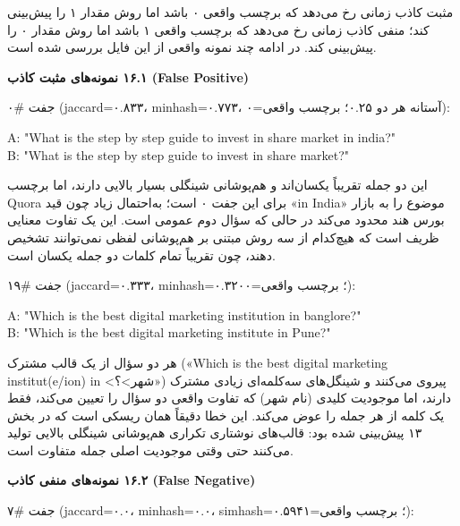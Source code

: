 \documentclass[11pt]{article}
\begin{document}
\noindent ‏مثبت کاذب زمانی رخ می‌دهد که برچسب واقعی ۰ باشد اما روش مقدار ۱ را پیش‌بینی کند؛ منفی کاذب زمانی رخ می‌دهد که برچسب واقعی ۱ باشد اما روش مقدار ۰ را پیش‌بینی کند. در ادامه چند نمونه واقعی از این فایل بررسی شده است.\par

\smallskip
{\bfseries ‏۱۶.۱ نمونه‌های مثبت کاذب (False Positive)}\smallskip


\noindent ‏جفت \#۰ (jaccard=۰.۸۳۳، minhash=۰.۷۷۳، آستانه هر دو ۰.۲۵؛ برچسب واقعی=۰):\par

{\mycode
\begin{flushleft}
A: "What is the step by step guide to invest in share market in india?" \\
B: "What is the step by step guide to invest in share market?"
\end{flushleft}}

\noindent ‏این دو جمله تقریباً یکسان‌اند و هم‌پوشانی شینگلی بسیار بالایی دارند، اما برچسب Quora برای این جفت ۰ است؛ به‌احتمال زیاد چون قید «in India» موضوع را به بازار بورس هند محدود می‌کند در حالی که سؤال دوم عمومی است. این یک تفاوت معنایی ظریف است که هیچ‌کدام از سه روش مبتنی بر هم‌پوشانی لفظی نمی‌توانند تشخیص دهند، چون تقریباً تمام کلمات دو جمله یکسان است.\par

\noindent ‏جفت \#۱۹ (jaccard=۰.۳۳۳، minhash=۰.۳۲۰؛ برچسب واقعی=۰):\par

{\mycode
\begin{flushleft}
A: "Which is the best digital marketing institution in banglore?" \\
B: "Which is the best digital marketing institute in Pune?"
\end{flushleft}}

\noindent ‏هر دو سؤال از یک قالب مشترک («Which is the best digital marketing institut(e/ion) in <شهر>؟») پیروی می‌کنند و شینگل‌های سه‌کلمه‌ای زیادی مشترک دارند، اما موجودیت کلیدی (نام شهر) که تفاوت واقعی دو سؤال را تعیین می‌کند، فقط یک کلمه از هر جمله را عوض می‌کند. این خطا دقیقاً همان ریسکی است که در بخش ۱۳ پیش‌بینی شده بود: قالب‌های نوشتاری تکراری هم‌پوشانی شینگلی بالایی تولید می‌کنند حتی وقتی موجودیت اصلی جمله متفاوت است.\par

\smallskip
{\bfseries ‏۱۶.۲ نمونه‌های منفی کاذب (False Negative)}\smallskip


\noindent ‏جفت \#۷ (jaccard=۰.۰، minhash=۰.۰، simhash=۰.۵۹۴؛ برچسب واقعی=۱):\par
\end{document}
